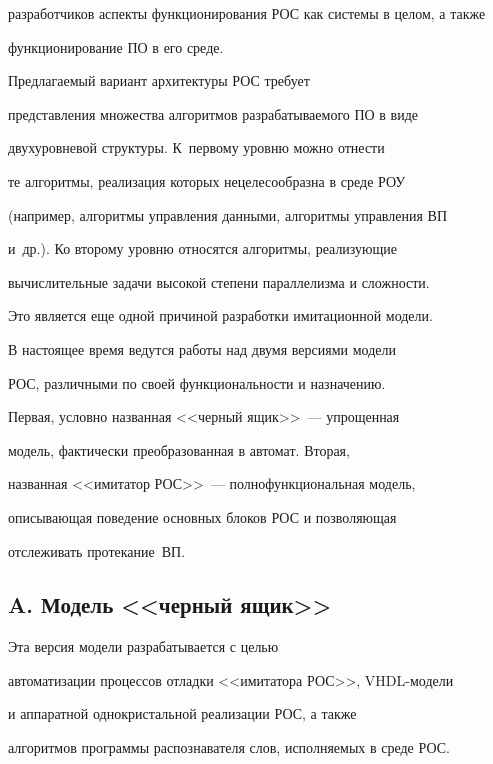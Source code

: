 разработчиков аспекты функционирования РОС как  системы в целом, а также 


функционирование ПО в его среде.


   


   Предлагаемый вариант  архитектуры РОС требует 


представления множества  алгоритмов разрабатываемого  ПО в виде 


двухуровневой структуры.  К~первому уровню можно отнести 


те алгоритмы, реализация которых  нецелесообразна в среде РОУ 


(например, алгоритмы управления данными, алгоритмы управления ВП 


и~др.). Ко второму уровню относятся алгоритмы, реализующие 


вычислительные задачи высокой  степени параллелизма и сложности. 


Это является еще одной причиной разработки имитационной модели.


   


   В настоящее время ведутся работы над двумя версиями модели 


РОС, различными по своей  функциональности и назначению. 


Первая, условно названная  <<черный ящик>>~--- упрощенная 


модель, фактически  преобразованная в автомат. Вторая, 


названная <<имитатор РОС>>~---  полнофункциональная модель, 


описывающая поведение основных блоков РОС и позволяющая 


отслеживать протекание~ВП. 





\subsection*{A. Модель <<черный  ящик>>}


   


   Эта версия модели  разрабатывается с целью 


автоматизации процессов отладки  <<имитатора РОС>>, VHDL-мо\-де\-ли 


и аппаратной однокристальной  реализации РОС, а также 


алгоритмов программы  распознавателя слов, исполняемых в среде РОС. 



